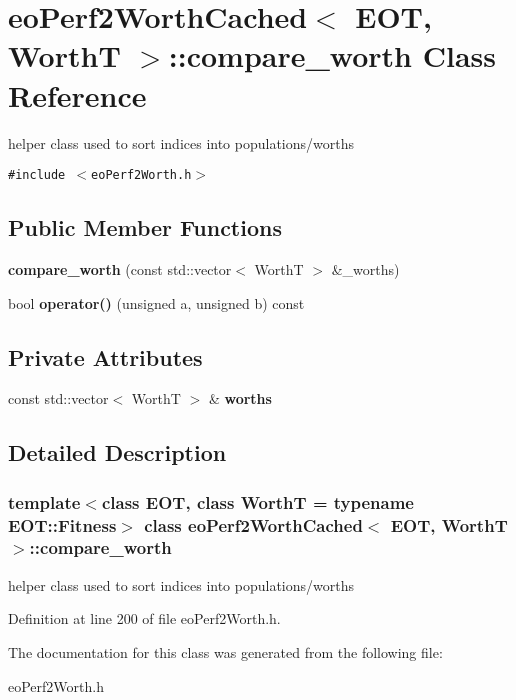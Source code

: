 \section{eo\-Perf2Worth\-Cached$<$ EOT, Worth\-T $>$::compare\_\-worth Class Reference}
\label{classeo_perf2_worth_cached_1_1compare__worth}
helper class used to sort indices into populations/worths  


{\tt \#include $<$eo\-Perf2Worth.h$>$}

\subsection*{Public Member Functions}
\begin{CompactItemize}
\item 
{\bf compare\_\-worth} (const std::vector$<$ Worth\-T $>$ \&\_\-worths)\label{classeo_perf2_worth_cached_1_1compare__worth_a0}

\item 
bool {\bf operator()} (unsigned a, unsigned b) const \label{classeo_perf2_worth_cached_1_1compare__worth_a1}

\end{CompactItemize}
\subsection*{Private Attributes}
\begin{CompactItemize}
\item 
const std::vector$<$ Worth\-T $>$ \& {\bf worths}\label{classeo_perf2_worth_cached_1_1compare__worth_r0}

\end{CompactItemize}


\subsection{Detailed Description}
\subsubsection*{template$<$class EOT, class Worth\-T = typename EOT::Fitness$>$ class eo\-Perf2Worth\-Cached$<$ EOT, Worth\-T $>$::compare\_\-worth}

helper class used to sort indices into populations/worths 



Definition at line 200 of file eo\-Perf2Worth.h.

The documentation for this class was generated from the following file:\begin{CompactItemize}
\item 
eo\-Perf2Worth.h\end{CompactItemize}
